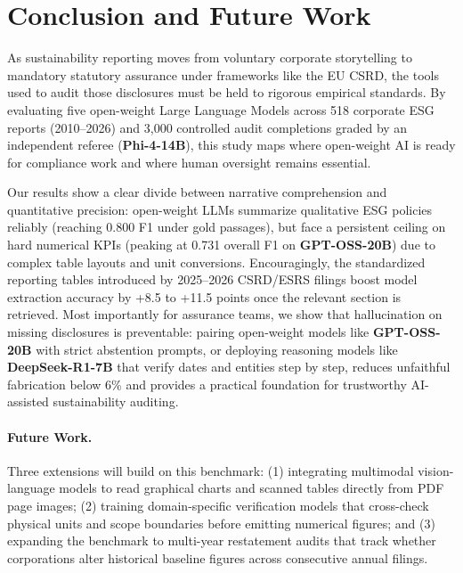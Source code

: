 \documentclass[11pt,letterpaper]{article}
\newcommand{\model}[1]{\textbf{#1}}
\begin{document}
\section{Conclusion and Future Work}
\label{sec:conclusion}

As sustainability reporting moves from voluntary corporate storytelling to mandatory statutory assurance under frameworks like the EU CSRD, the tools used to audit those disclosures must be held to rigorous empirical standards. By evaluating five open-weight Large Language Models across 518 corporate ESG reports (2010--2026) and 3,000 controlled audit completions graded by an independent referee (\model{Phi-4-14B}), this study maps where open-weight AI is ready for compliance work and where human oversight remains essential.

Our results show a clear divide between narrative comprehension and quantitative precision: open-weight LLMs summarize qualitative ESG policies reliably (reaching 0.800 F1 under gold passages), but face a persistent ceiling on hard numerical KPIs (peaking at 0.731 overall F1 on \model{GPT-OSS-20B}) due to complex table layouts and unit conversions. Encouragingly, the standardized reporting tables introduced by 2025--2026 CSRD/ESRS filings boost model extraction accuracy by +8.5 to +11.5 points once the relevant section is retrieved. Most importantly for assurance teams, we show that hallucination on missing disclosures is preventable: pairing open-weight models like \model{GPT-OSS-20B} with strict abstention prompts, or deploying reasoning models like \model{DeepSeek-R1-7B} that verify dates and entities step by step, reduces unfaithful fabrication below 6\% and provides a practical foundation for trustworthy AI-assisted sustainability auditing.

\paragraph{Future Work.}
Three extensions will build on this benchmark: (1) integrating multimodal vision-language models to read graphical charts and scanned tables directly from PDF page images; (2) training domain-specific verification models that cross-check physical units and scope boundaries before emitting numerical figures; and (3) expanding the benchmark to multi-year restatement audits that track whether corporations alter historical baseline figures across consecutive annual filings.

\end{document}
